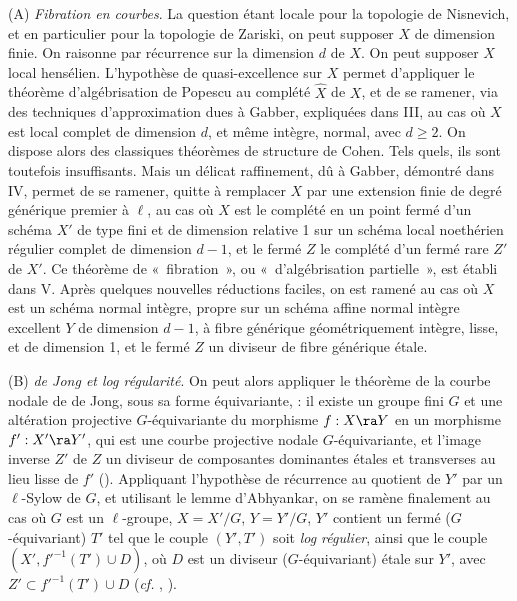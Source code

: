 \documentclass[10pt]{../fichiers-configuration-latex/smfart}
\begin{document}
(A) \textit{Fibration en courbes}. La question étant locale pour la topologie de Nisnevich, et en
particulier pour la topologie de Zariski, on peut supposer $X$ de dimension finie. On raisonne par
récurrence sur la dimension $d$ de $X$. On peut supposer $X$ local hensélien. L'hypothèse de
quasi-excellence sur $X$ permet d'appliquer le théorème d'algébrisation de Popescu au complété
$\widehat X$ de $X$, et de se ramener, via des techniques d'approximation dues à Gabber, expliquées
dans III, au cas où $X$ est local complet de dimension $d$, et même intègre, normal, avec $d \ge 2$.
On dispose alors des classiques théorèmes de structure de Cohen. Tels quels, ils sont toutefois
insuffisants. Mais un délicat raffinement, dû à Gabber, démontré dans IV, permet de se ramener,
quitte à remplacer $X$ par une extension finie de degré générique premier à $\ell$, au cas où $X$
est le complété en un point fermé d'un schéma $X'$ de type fini et de dimension relative 1 sur un
schéma local noethérien régulier complet de dimension $d-1$, et le fermé $Z$ le complété d'un fermé
rare $Z'$ de $X'$. Ce théorème de « fibration », ou « d'algébrisation partielle », est
établi dans V. Après quelques nouvelles réductions faciles, on est ramené au cas où $X$ est un
schéma normal intègre, propre sur un schéma affine normal intègre excellent $Y$ de dimension $d-1$,
à fibre générique géométriquement intègre, lisse, et de dimension 1, et le fermé $Z$ un diviseur de
fibre générique étale. 

(B) \textit{de Jong et log régularité}. On peut alors appliquer le théorème de la courbe nodale de
de Jong, sous sa forme équivariante, \cite[2.4]{Families@de_Jong} : il existe un groupe fini $G$ et
une altération projective $G$-équivariante du morphisme $f : X \ra Y$ en un morphisme $f' : X' \ra
Y'$, qui est une courbe projective nodale $G$-équivariante, et l'image inverse $Z'$ de $Z$ un
diviseur de composantes dominantes étales et transverses au lieu lisse de $f'$ ().
Appliquant l'hypothèse de récurrence au quotient de $Y'$ par un $\ell$-Sylow de $G$, et utilisant le
lemme d'Abhyankar, on se ramène finalement au cas où $G$ est un $\ell$-groupe, $X = X'/G$, $Y =
Y'/G$, $Y'$ contient un fermé ($G$-équivariant) $T'$ tel que le couple $(Y',T')$ soit \textit{log
régulier}, ainsi que le couple $(X',f'^{-1}(T') \cup D)$, où $D$ est un diviseur ($G$-équivariant)
étale sur $Y'$, avec $Z' \subset f'^{-1}(T') \cup D$ (\textit{cf.} , ). 
\end{document}
